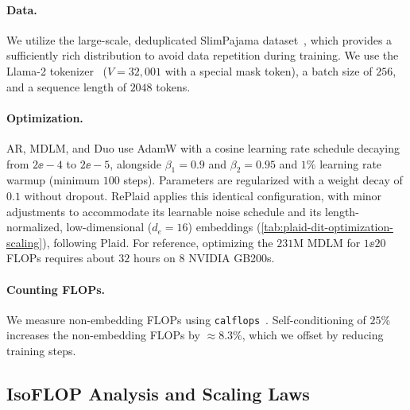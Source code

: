 \documentclass{article}
\begin{document}
\paragraph{Data.} We utilize the large-scale, deduplicated SlimPajama dataset~\citep{cerebras2023slimpajama}, which provides a sufficiently rich distribution to avoid data repetition during training. We use the Llama-2 tokenizer~\citep{touvron2023llama2} ($V=32{,}001$ with a special mask token), a batch size of $256$, and a sequence length of $2048$ tokens. 

\paragraph{Optimization.} AR, MDLM, and Duo use AdamW with a cosine learning rate schedule decaying from $2\ee{-}4$ to $2\ee{-}5$, alongside $\beta_1{=}0.9$ and $\beta_2{=}0.95$ and $1\%$ learning rate warmup (minimum $100$ steps). Parameters are regularized with a weight decay of $0.1$ without dropout. RePlaid applies this identical configuration, with minor adjustments  to accommodate its learnable noise schedule and its length-normalized, low-dimensional ($d_e=16$) embeddings (\cref{tab:plaid-dit-optimization-scaling}), following Plaid. For reference, optimizing the $231$M MDLM for $1\ee20$ FLOPs requires about $32$ hours on $8$ NVIDIA GB200s.

%
%

%


%

\paragraph{Counting FLOPs.} We measure non-embedding FLOPs using \texttt{calflops}~\citep{calflops}. Self-conditioning of $25\%$ increases the non-embedding FLOPs by $\approx8.3\%$, which we offset by reducing training steps. 

%


%

\subsection{IsoFLOP Analysis and Scaling Laws}
\label{subsec:isoflop}
\end{document}
